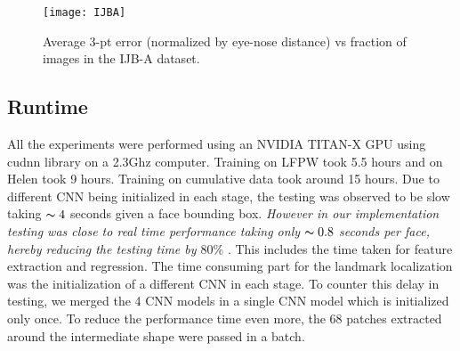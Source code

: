 \documentclass[10pt,twocolumn,letterpaper]{article}
\begin{document}
\begin{table}[thp!]
\begin{center}
\vskip 4pt
\caption{Averaged error comparison of different methods on the Helen dataset.} 
\label{tbl:Helen}
\end{center}
\end{table}

\begin{figure}[htp]
 \centering
\texttt{[image: IJBA]}
\vskip 4pt
\caption{Average 3-pt error (normalized by eye-nose distance) vs fraction of images in the IJB-A dataset.}
\label{fig:Errors_IJBA}
\end{figure}

\subsection{Runtime} All the experiments were performed using an NVIDIA TITAN-X GPU using cudnn library on a 2.3Ghz computer. Training on LFPW took 5.5 hours and on Helen took 9 hours. Training on cumulative data took around 15 hours. Due to different CNN being initialized in each stage, the testing was observed to be slow taking $\thicksim 4$ seconds given a face bounding box. \textit{However in our implementation testing was close to real time performance taking only $\thicksim 0.8$ seconds per face, hereby reducing the testing time by $80\% $ }. This includes the time taken for feature extraction and regression. The time consuming part for the landmark localization was the initialization of a different CNN in each stage. To counter this delay in testing, we merged the 4 CNN models in a single CNN model which is initialized only once. To reduce the performance time even more, the 68 patches extracted around the intermediate shape were passed in a batch. 
\end{document}
